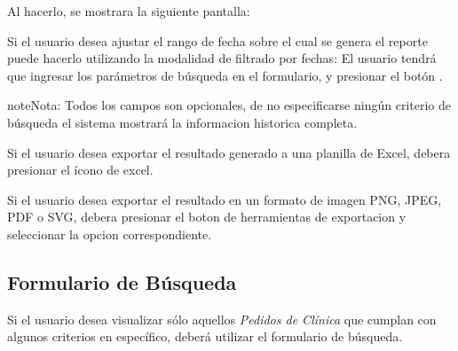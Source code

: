 \documentclass[a4paper,10pt,spanish]{sphinxmanual}
\begin{document}

Al hacerlo, se mostrara la siguiente pantalla:


Si el usuario desea ajustar el rango de fecha sobre el cual se genera el reporte puede hacerlo utilizando la modalidad de filtrado por fechas:
El usuario tendrá que ingresar los parámetros de búsqueda en el formulario, y presionar el botón .

\begin{notice}{note}{Nota:}
Todos los campos son opcionales, de no especificarse ningún criterio de búsqueda el sistema mostrará la informacion historica completa.
\end{notice}


Si el usuario desea exportar el resultado generado a una planilla de Excel, debera presionar el ícono de excel.


Si el usuario desea exportar el resultado en un formato de imagen PNG, JPEG, PDF o SVG, debera presionar el boton de herramientas de exportacion y seleccionar la opcion correspondiente.



\subsection{Formulario de Búsqueda}
\label{pedidosclinica:formulario-busqueda-pc}\label{pedidosclinica:formulario-de-busqueda}
Si el usuario desea visualizar sólo aquellos \emph{Pedidos de Clínica} que cumplan con algunos criterios en específico, deberá utilizar el formulario de búsqueda.
\end{document}
